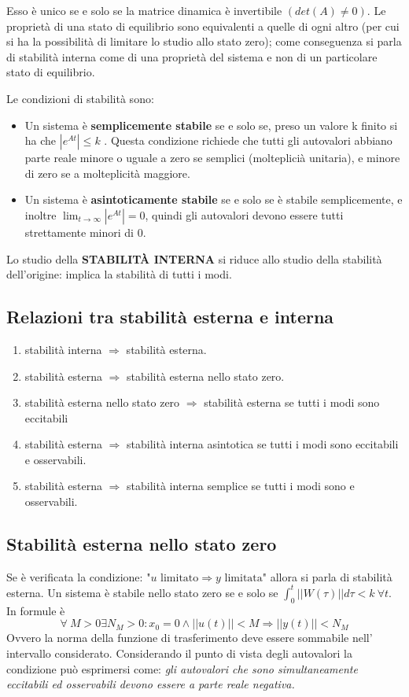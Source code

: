 \documentclass{article}
\begin{document}
Esso è unico se e solo se la matrice dinamica è invertibile  $(det(A)\neq 0)$.
Le proprietà di una stato di equilibrio sono equivalenti a quelle di ogni altro (per cui si ha la possibilità di limitare lo studio allo stato zero);
come conseguenza si parla di stabilità interna come di una proprietà del sistema e non di un particolare stato di equilibrio.

Le condizioni di stabilità sono:
\begin{itemize}
    \item Un sistema è \textbf{semplicemente stabile} se e solo se, preso un valore k finito si ha che ${|e^{At}|\leq k}$ .
    Questa condizione richiede che tutti gli autovalori abbiano
    parte reale minore o uguale a zero se semplici (molteplicià unitaria), e minore di zero se a molteplicità maggiore.
    \item Un sistema è \textbf{asintoticamente stabile} se e solo se è stabile semplicemente,
    e inoltre \(\displaystyle \lim_{t \to\infty }|e^{At}|=0 \), quindi gli autovalori devono essere tutti strettamente minori di 0.
\end{itemize}

Lo studio della \textbf{STABILITÀ INTERNA} si riduce allo studio della stabilità dell'origine: implica la stabilità di tutti i modi.


\subsection{Relazioni tra stabilità esterna e interna}
\begin{enumerate}
    \item stabilità interna $\Longrightarrow$ stabilità esterna.
    \item stabilità esterna $\Longrightarrow$ stabilità esterna nello stato zero.
    \item stabilità esterna nello stato zero $\Longrightarrow$ stabilità esterna se tutti i modi sono eccitabili
    \item stabilità esterna $\Longrightarrow$
    stabilità interna asintotica se tutti i modi sono eccitabili e osservabili.
    \item stabilità esterna $\Longrightarrow$ 
    stabilità interna semplice se tutti i modi sono e osservabili.
\end{enumerate}


\subsection{Stabilità esterna nello stato zero}
Se è verificata la condizione: "$u \text{ limitato} \Longrightarrow y \text{ limitata}$" allora si parla di stabilità esterna.
Un sistema è stabile nello stato zero se e solo se \(\displaystyle \int_{0}^{t}||W(\tau)||d\tau < k \ \forall t \).
In formule è
\[
    \forall\ M>0  \exists N_M>0 : x_0=0 \wedge  ||u(t)||<M\Longrightarrow||y(t)||<N_M
\]
Ovvero la norma della funzione di trasferimento deve essere sommabile nell' intervallo
considerato. Considerando il punto di vista degli autovalori la condizione può
esprimersi come: \textit{gli autovalori che sono simultaneamente eccitabili ed osservabili
devono essere a parte reale negativa.}
\end{document}
